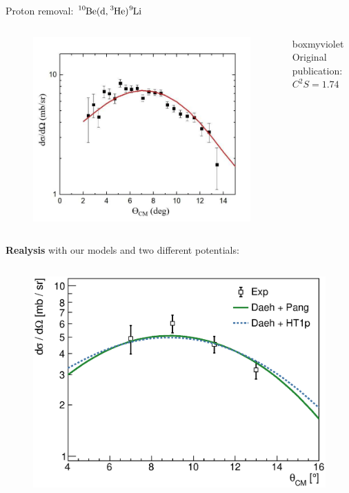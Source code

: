 \documentclass[sans,
frameno, %
mp,
usenames,dvipsnames, %
onlytextwidth, %
t,%
11pt]{beamer}
\newcommand{\iso}[2]{\ce{^{#1}#2}}
\begin{document}
\begin{frame}{Proton removal: $\iso{10}{Be}(\textrm{d}, \iso{3}{He})\iso{9}{Li}$}
{\begin{columns}[c]
{\begin{figure}
                    \includegraphics[width=0.8\linewidth, cfbox=Mulberry 1pt 0pt 0pt]{figures/acculina_xs.png}%
                \end{figure}
                \medskip
                \hfill
                \begin{beamercolorbox}[sep=1ex,center, rounded=true, wd=0.95\linewidth]{boxmyviolet}
                    Original publication:\\
                    $C^2S = \qty{1.74}{}$
                \end{beamercolorbox}
                \hfill
            }
        \end{columns}
    }
    {
        \textbf{Realysis} with our models and two different \iso{3}{He} potentials:
        \begin{columns}[c]
            {
                \begin{figure}
                    \centering
                    \includegraphics[width=\linewidth, cfbox=myorange 1pt 0pt 0pt]{figures/Workshop/10Be_d3He_xs_HT1p.eps}

\end{figure}}
\end{columns}}
\end{frame}
\end{document}
